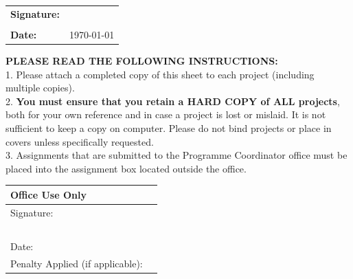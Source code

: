 \begin{table}[htbp]
\begin{center}
\begin{tabular}{||p{}|p{}||}
\hline
\textbf{Signature:}& \\
 & \\\hline 
\textbf{Date:}& \today  \\\hline

\end{tabular}
\end{center}
\end{table}

\vspace{-.5cm}
\textbf{PLEASE READ THE FOLLOWING INSTRUCTIONS:}\\
1. Please attach a completed copy of this sheet to each project (including
multiple copies).\\
2. \textbf{You must ensure that you retain a HARD COPY of ALL projects},
both for your own reference and in case a project is lost or mislaid. It is
not sufficient to keep a copy on computer. Please do not bind projects or
place in covers unless specifically requested.\\
3. Assignments that are submitted to the Programme Coordinator office must be
placed into the assignment box located outside the office.

\begin{table}[htbp]
\begin{center}
\begin{tabular}{||p{}|p{}||}
\hline
\multicolumn{2}{||l||}{\textbf{Office Use Only}} \\\hline
Signature:& \\
~ & \\\hline
Date:& \\\hline
Penalty Applied (if applicable):& \\\hline
\end{tabular}
\end{center}
\end{table}